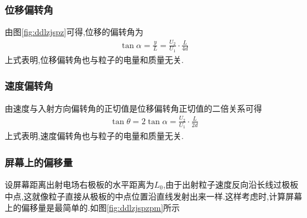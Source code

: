 \subsubsection{位移偏转角}

由图\ref{fig:ddlzjspz}可得,位移的偏转角为
\begin{gather}
  \tan\alpha=\frac{y}{L}=\frac{U_2}{U_1}\cdot \frac{L}{4d}
\end{gather}
上式表明,位移偏转角也与粒子的电量和质量无关.

\subsubsection{速度偏转角}

由速度与入射方向偏转角的正切值是位移偏转角正切值的二倍关系可得
\begin{gather}
 \tan\theta=2\tan\alpha= \frac{U_2}{U_1}\cdot \frac{L}{2d}
\end{gather}
上式表明,速度偏转角也与粒子的电量和质量无关.

\subsubsection{屏幕上的偏移量}

设屏幕距离出射电场右极板的水平距离为$L_0$,由于出射粒子速度反向沿长线过极板中点,这就像粒子直接从极板的中点位置沿直线发射出来一样.这样考虑时,计算屏幕上的偏移量是最简单的.如图\ref{fig:ddlzjspzpm}所示

